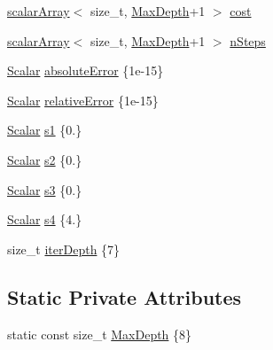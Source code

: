 \begin{DoxyCompactItemize}
\item 
\mbox{\hyperlink{class_b_s_iterator_ab0aa7c10b56500273af05dcd85fd8389}{scalar\+Array}}$<$ size\+\_\+t, \mbox{\hyperlink{class_b_s_iterator_a39409b9a12d4854d101ce59a0efc0f74}{Max\+Depth}}+1 $>$ \mbox{\hyperlink{class_b_s_iterator_a53f435811c23c0ae1713df13197fc9c9}{cost}}
\item 
\mbox{\hyperlink{class_b_s_iterator_ab0aa7c10b56500273af05dcd85fd8389}{scalar\+Array}}$<$ size\+\_\+t, \mbox{\hyperlink{class_b_s_iterator_a39409b9a12d4854d101ce59a0efc0f74}{Max\+Depth}}+1 $>$ \mbox{\hyperlink{class_b_s_iterator_a9c4c8c17a759cdff694e0bd62ed249bd}{n\+Steps}}
\item 
\mbox{\hyperlink{class_b_s_iterator_a7857f8ff9032955ea4dcc22cd18ca7a1}{Scalar}} \mbox{\hyperlink{class_b_s_iterator_a8948aa04b0ec390d43eb3d1f0a2efb03}{absolute\+Error}} \{1e-\/15\}
\item 
\mbox{\hyperlink{class_b_s_iterator_a7857f8ff9032955ea4dcc22cd18ca7a1}{Scalar}} \mbox{\hyperlink{class_b_s_iterator_abce71b7bac10363f7772dc848f8722b6}{relative\+Error}} \{1e-\/15\}
\item 
\mbox{\hyperlink{class_b_s_iterator_a7857f8ff9032955ea4dcc22cd18ca7a1}{Scalar}} \mbox{\hyperlink{class_b_s_iterator_a942f85e00c28ef1990d1dfbed69c9e13}{s1}} \{0.\}
\item 
\mbox{\hyperlink{class_b_s_iterator_a7857f8ff9032955ea4dcc22cd18ca7a1}{Scalar}} \mbox{\hyperlink{class_b_s_iterator_ad1cdde25df6bca7a456c1908be54065f}{s2}} \{0.\}
\item 
\mbox{\hyperlink{class_b_s_iterator_a7857f8ff9032955ea4dcc22cd18ca7a1}{Scalar}} \mbox{\hyperlink{class_b_s_iterator_a10ea0bb96f7971e9c477daef1fda6e16}{s3}} \{0.\}
\item 
\mbox{\hyperlink{class_b_s_iterator_a7857f8ff9032955ea4dcc22cd18ca7a1}{Scalar}} \mbox{\hyperlink{class_b_s_iterator_a5b3bbb2d988a5d91030060508e3b4f66}{s4}} \{4.\}
\item 
size\+\_\+t \mbox{\hyperlink{class_b_s_iterator_aa073f847cc5855f727c8f326f539a5f0}{iter\+Depth}} \{7\}
\end{DoxyCompactItemize}
\subsection*{Static Private Attributes}
\begin{DoxyCompactItemize}
\item 
static const size\+\_\+t \mbox{\hyperlink{class_b_s_iterator_a39409b9a12d4854d101ce59a0efc0f74}{Max\+Depth}} \{8\}
\end{DoxyCompactItemize}


